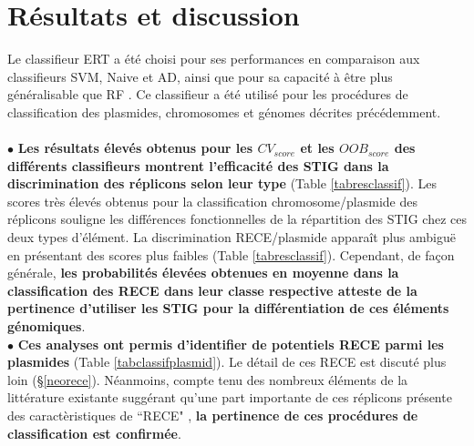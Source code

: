 \section{Résultats et discussion}	 
	  Le classifieur ERT a été choisi pour ses performances en comparaison aux classifieurs SVM, Naive et AD, ainsi que pour sa capacité à être plus généralisable que RF \citep{Geurts2006a}. Ce classifieur a été utilisé pour les procédures de classification des plasmides, chromosomes et génomes décrites précédemment.\\
\\
 $\bullet$ \textbf{Les résultats élevés obtenus pour les $CV_{score}$ et les $OOB_{score}$ des différents classifieurs montrent l'efficacité des STIG dans la discrimination des réplicons selon leur type} (Table \ref{tabresclassif}). Les scores très élevés obtenus pour la classification chromosome/plasmide des réplicons souligne les différences fonctionnelles de la répartition des STIG chez ces deux types d'élément. La discrimination RECE/plasmide apparaît plus ambiguë en présentant des scores plus faibles (Table \ref{tabresclassif}). Cependant, de façon générale, \textbf{\color{orange}les probabilités élevées obtenues en moyenne dans la classification des RECE dans leur classe respective atteste de la pertinence d'utiliser les STIG pour la différentiation de ces éléments génomiques}.\\  

$\bullet$ \textbf{Ces analyses ont permis d'identifier de potentiels RECE parmi les plasmides} (Table \ref{tabclassifplasmid}). Le détail de ces RECE est discuté plus loin (\S  \ref{neorece}). Néanmoins, compte tenu des nombreux éléments de la littérature existante suggérant qu'une part importante de ces réplicons présente des caractèristiques de ``RECE" , \textbf{\color{orange} la pertinence de ces procédures de classification est confirmée}.\\

